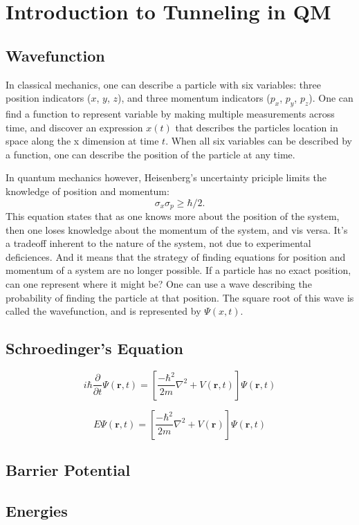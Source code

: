 \chapter{Introduction to Tunneling in QM}	


\section{Wavefunction}	
In classical mechanics, one can describe a particle with six variables: three position indicators ($x$, $y$, $z$), and three momentum indicators ($p_x$, $p_y$, $p_z$). One can find a function to represent variable by making multiple measurements across time, and discover an expression $x(t)$ that describes the particles location in space along the x dimension at time $t$. When all six variables can be described by a function, one can describe the position of the particle at any time.  

In quantum mechanics however, Heisenberg's uncertainty priciple limits the knowledge of position and momentum: 
$$\sigma_{x} \sigma_{p} \geq \hbar/2. $$
This equation states that as one knows more about the position of the system, then one loses knowledge about the momentum of the system, and vis versa. It's a tradeoff inherent to the nature of the system, not due to experimental deficiences. And it means that the strategy of finding equations for position and momentum of a system are no longer possible. If a particle has no exact position, can one represent where it might be? One can use a wave describing the probability of finding the particle at that position. The square root of this wave is called the wavefunction, and is represented by $\Psi(x, t)$.


\section{Schroedinger's Equation}

$$i\hbar\frac{\partial}{\partial t} \Psi(\mathbf{r},t) = \left [ \frac{-\hbar^2}{2m}\nabla^2 + V(\mathbf{r},t)\right ] \Psi(\mathbf{r},t) $$

$$E \Psi(\mathbf{r},t) = \left [ \frac{-\hbar^2}{2m}\nabla^2 + V(\mathbf{r})\right ] \Psi(\mathbf{r},t)$$

\section{Barrier Potential}

\section{Energies}
